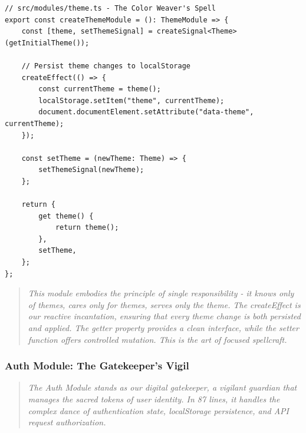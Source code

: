 \documentclass[11pt]{article}
\begin{document}
\begin{lstlisting}[style=typescript]
// src/modules/theme.ts - The Color Weaver's Spell
export const createThemeModule = (): ThemeModule => {
    const [theme, setThemeSignal] = createSignal<Theme>(getInitialTheme());

    // Persist theme changes to localStorage
    createEffect(() => {
        const currentTheme = theme();
        localStorage.setItem("theme", currentTheme);
        document.documentElement.setAttribute("data-theme", currentTheme);
    });

    const setTheme = (newTheme: Theme) => {
        setThemeSignal(newTheme);
    };

    return {
        get theme() {
            return theme();
        },
        setTheme,
    };
};
\end{lstlisting}

\begin{quote}
\emph{This module embodies the principle of single responsibility - it knows only of themes, cares only for themes, serves only the theme. The createEffect is our reactive incantation, ensuring that every theme change is both persisted and applied. The getter property provides a clean interface, while the setter function offers controlled mutation. This is the art of focused spellcraft.}
\end{quote}

\subsubsection{Auth Module: The Gatekeeper's Vigil}

\begin{quote}
\emph{The Auth Module stands as our digital gatekeeper, a vigilant guardian that manages the sacred tokens of user identity. In 87 lines, it handles the complex dance of authentication state, localStorage persistence, and API request authorization.}
\end{quote}
\end{document}
